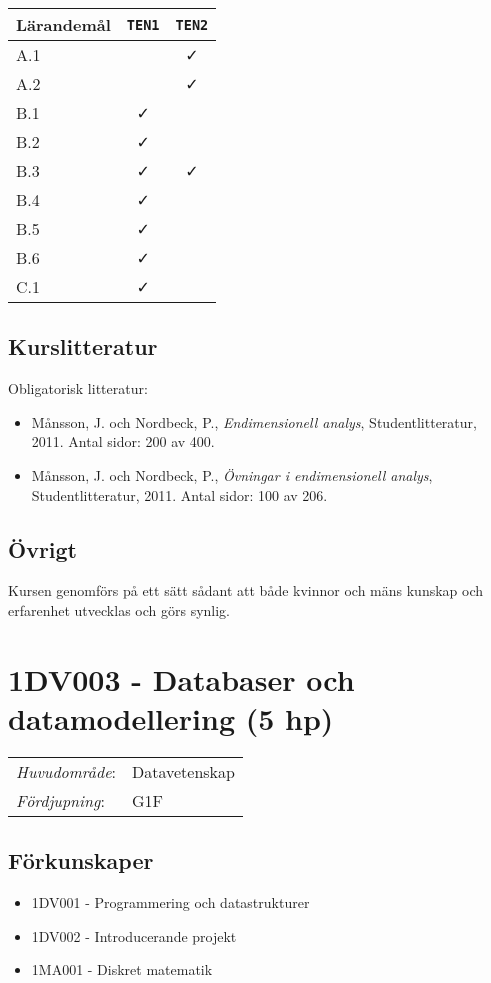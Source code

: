 \begin{longtable}[]{@{}lcc@{}}
\toprule
\textsf{Lärandemål} & \texttt{TEN1} & \texttt{TEN2}\tabularnewline
\midrule
\endhead
A.1 & & \faCheck\tabularnewline
A.2 & & \faCheck\tabularnewline
B.1 & \faCheck &\tabularnewline
B.2 & \faCheck &\tabularnewline
B.3 & \faCheck & \faCheck\tabularnewline
B.4 & \faCheck &\tabularnewline
B.5 & \faCheck &\tabularnewline
B.6 & \faCheck &\tabularnewline
C.1 & \faCheck &\tabularnewline
\bottomrule
\end{longtable}

\subsection*{Kurslitteratur}

Obligatorisk litteratur:

\begin{itemize}
\tightlist
\item
  Månsson, J. och Nordbeck, P., \emph{Endimensionell analys},
  Studentlitteratur, 2011. Antal sidor: 200 av 400.
\item
  Månsson, J. och Nordbeck, P., \emph{Övningar i endimensionell analys},
  Studentlitteratur, 2011. Antal sidor: 100 av 206.
\end{itemize}

\subsection*{Övrigt}

Kursen genomförs på ett sätt sådant att både kvinnor och mäns kunskap och erfarenhet utvecklas och görs synlig.
\pagebreak
\section*{1DV003 - Databaser och datamodellering (5 hp)}

\begin{tabular}{ll}\emph{Huvudområde}: & Datavetenskap\tabularnewline\emph{Fördjupning}: & G1F\tabularnewline\end{tabular}

\subsection*{Förkunskaper}

\begin{itemize}
\tightlist
\item
  1DV001 - Programmering och datastrukturer
\item
  1DV002 - Introducerande projekt
\item
  1MA001 - Diskret matematik
\end{itemize}

